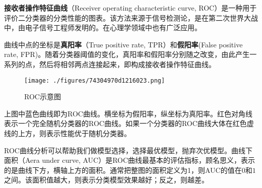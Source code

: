 

\textbf{接收者操作特征曲线}（Receiver operating characteristic curve, ROC）是一种用于评价二分类器的分类性能的图表。该方法来源于信号检测论，是在第二次世界大战中，由电子信号工程师发明的。在心理学领域中也有广泛应用。

曲线中点的坐标是\textbf{真阳率}（True positive rate, TPR）和\textbf{假阳率}(False positive rate, FPR)。随着分类器阈值的变化，真阳率和假阳率分别随之改变，由此产生一系列的点，然后将相邻两点连接起来，即构成接收者操作特征曲线。

\begin{figure}[ht]
\centering
\texttt{[image: ./figures/74304970d1216023.png]}
\caption{ROC示意图} \label{fig_ROC_1}
\end{figure}
上图中蓝色曲线即为ROC曲线。横坐标为假阳率，纵坐标为真阳率。红色对角线表示一个完全随机分类器的ROC曲线。如果一个分类器的ROC曲线大体在红色虚线的上方，则表示性能优于随机分类器。

ROC曲线分析可以帮助我们做模型选择，选择最优模型，抛弃次优模型。曲线下面积（Aera under curve, AUC）是ROC曲线最基本的评估指标，顾名思义，表示的是曲线下方，横轴上方的面积。通常把整图的面积定义为1，则AUC的值在$0$和$1$之间。该面积值越大，则表示分类模型效果越好；反之，则越差。